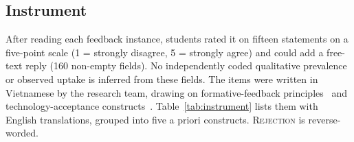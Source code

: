 \documentclass[runningheads]{llncs}
\begin{document}
\subsection{Instrument}
After reading each feedback instance, students rated it on fifteen statements on a five-point scale (1 = strongly disagree, 5 = strongly agree) and could add a free-text reply (160 non-empty fields). No independently coded qualitative prevalence or observed uptake is inferred from these fields. The items were written in Vietnamese by the research team, drawing on formative-feedback principles~\cite{shute2008focus} and technology-acceptance constructs~\cite{davis1989perceived,venkatesh2003user,lee2004trust}. Table~\ref{tab:instrument} lists them with English translations, grouped into five a priori constructs. \textsc{Rejection} is reverse-worded.
\end{document}

